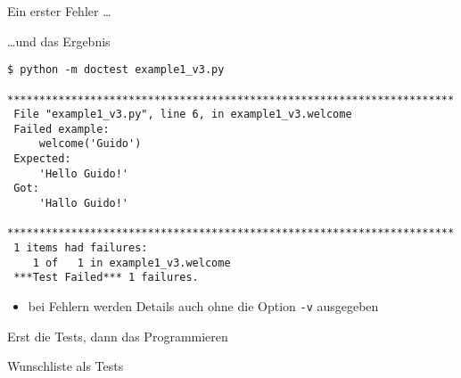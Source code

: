 \documentclass[t, utf8x, 10pt]{beamer}
\begin{document}
\begin{frame}{Ein erster Fehler \dots}
 
\end{frame}


\begin{frame}[fragile]{\dots und das Ergebnis}
 \begin{lstlisting}[language={}]
 $ python -m doctest example1_v3.py
 **********************************************************************
 File "example1_v3.py", line 6, in example1_v3.welcome
 Failed example:
     welcome('Guido')
 Expected:
     'Hello Guido!'
 Got:
     'Hallo Guido!'
 **********************************************************************
 1 items had failures:
    1 of   1 in example1_v3.welcome
 ***Test Failed*** 1 failures.
 \end{lstlisting}

 \begin{itemize}
  \item bei Fehlern werden Details auch ohne die Option \texttt{-v} ausgegeben
 \end{itemize}
\end{frame}


\begin{frame}[c]{Erst die Tests, dann das Programmieren}
 \begin{center}
  \begin{Large}
   \setlength{}	  
  \end{Large}
 \end{center}
\end{frame}


\begin{frame}{Wunschliste als Tests}
 
\end{frame}
\end{document}
